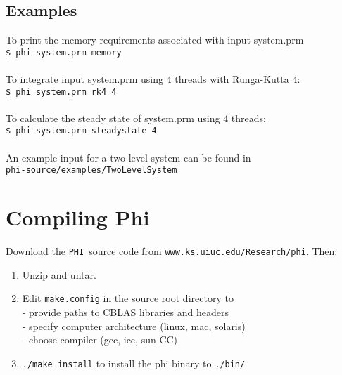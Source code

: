\documentclass[11pt]{article}
\newcommand{\PHI}{\texttt{PHI}}
\begin{document}
\subsection{Examples}
To print the memory requirements associated with input system.prm\\
{\tt \$ phi system.prm memory}\\\\
To integrate input system.prm using 4 threads with Runga-Kutta 4:\\
{\tt \$ phi system.prm rk4 4}\\\\
To calculate the steady state of system.prm using 4 threads:\\
{\tt \$ phi system.prm steadystate 4}\\\\
An example input for a two-level system can be found in\\
{\tt phi-source/examples/TwoLevelSystem}


\section{Compiling Phi}
Download the \PHI\ source code from {\tt www.ks.uiuc.edu/Research/phi}. Then:

\begin{enumerate}
\item Unzip and untar.

\item Edit {\tt make.config} in the source root directory to \\
    - provide paths to CBLAS libraries and headers\\
    - specify computer architecture (linux, mac, solaris)\\
    - choose compiler (gcc, icc, sun CC)

\item {\tt ./make install} to install the phi binary to {\tt ./bin/}
\end{enumerate}
\end{document}
